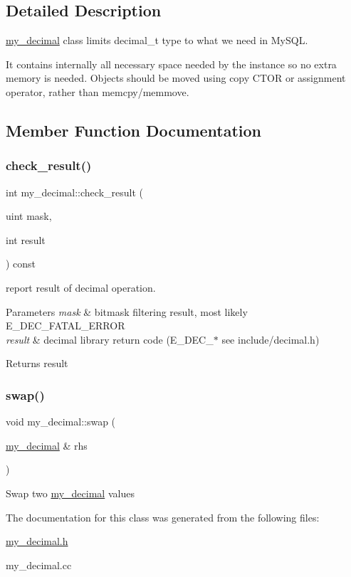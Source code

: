 \subsection{Detailed Description}
\mbox{\hyperlink{classmy__decimal}{my\+\_\+decimal}} class limits \textquotesingle{}decimal\+\_\+t\textquotesingle{} type to what we need in My\+S\+QL.

It contains internally all necessary space needed by the instance so no extra memory is needed. Objects should be moved using copy C\+T\+OR or assignment operator, rather than memcpy/memmove. 

\subsection{Member Function Documentation}
\mbox{\label{classmy__decimal_a9fc01f08993732970194ffb50c041028}} 
\subsubsection{\texorpdfstring{check\+\_\+result()}{check\_result()}}
{\footnotesize\ttfamily int my\+\_\+decimal\+::check\+\_\+result (\begin{DoxyParamCaption}\item[{uint}]{mask,  }\item[{int}]{result }\end{DoxyParamCaption}) const}

report result of decimal operation.


\begin{DoxyParams}{Parameters}
{\em mask} & bitmask filtering result, most likely E\+\_\+\+D\+E\+C\+\_\+\+F\+A\+T\+A\+L\+\_\+\+E\+R\+R\+OR \\
\hline
{\em result} & decimal library return code (E\+\_\+\+D\+E\+C\+\_\+$\ast$ see include/decimal.\+h)\\
\hline
\end{DoxyParams}
\begin{DoxyReturn}{Returns}
result 
\end{DoxyReturn}
\mbox{\label{classmy__decimal_af4c268a43bd0a237c9f147950af907fb}} 
\subsubsection{\texorpdfstring{swap()}{swap()}}
{\footnotesize\ttfamily void my\+\_\+decimal\+::swap (\begin{DoxyParamCaption}\item[{\mbox{\hyperlink{classmy__decimal}{my\+\_\+decimal}} \&}]{rhs }\end{DoxyParamCaption})\hspace{0.3cm}{\ttfamily [inline]}}

Swap two \mbox{\hyperlink{classmy__decimal}{my\+\_\+decimal}} values 

The documentation for this class was generated from the following files\+:\begin{DoxyCompactItemize}
\item 
\mbox{\hyperlink{my__decimal_8h}{my\+\_\+decimal.\+h}}\item 
my\+\_\+decimal.\+cc\end{DoxyCompactItemize}

